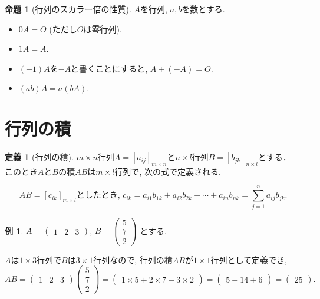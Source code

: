 \documentclass[dvipdfmx,a4paper,11pt]{article}
\theoremstyle{definition}
\newtheorem{prop}[thm]{命題}
\newtheorem{dfn}[thm]{定義}
\newtheorem{exa}[thm]{例}
\begin{document}
 
 \begin{tcolorbox}[
    colback = white,
    colframe = green!35!black,
    fonttitle = \bfseries,
    breakable = true]
    \begin{prop}[行列のスカラー倍の性質]
$A$を行列, $a,b$を数とする.
 \begin{itemize}
 \item $0A =O$ (ただし$O$は零行列).
  \item $1A=A$. 
  \item $(-1)A$を$-A$と書くことにすると, $A + (-A) =O$.　
  \item $(ab) A = a(bA)$.
 \end{itemize}
  \end{prop}
 \end{tcolorbox}
 
 \section{行列の積}
 
  \begin{tcolorbox}[
    colback = white,
    colframe = green!35!black,
    fonttitle = \bfseries,
    breakable = true]
    \begin{dfn}[行列の積]
    
 $m \times n$行列$A = [a_{ij}]_{m \times n}$と$n \times l$行列$B= [b_{jk}]_{n \times l}$とする．
このとき$A$と$B$の積$AB$は$m \times l$行列で, 次の式で定義される.

$$
AB = [c_{ik}]_{m \times l}\text{としたとき, }
c_{ik} = a_{i1}b_{1k} + a_{i2}b_{2k} + \cdots + a_{in}b_{nk} = \sum_{j=1}^{n} a_{ij}b_{jk}.
$$
  \end{dfn}
 \end{tcolorbox}
 
 \begin{exa}
 $ A=\begin{pmatrix} 1 &2 &3 \end{pmatrix}$, 
 $ 
 B = 
 \begin{pmatrix}
5 \\7\\2
 \end{pmatrix}
 $
 とする. 
 
 $A$は$1\times 3$行列で$B$は$3 \times 1$行列なので, 行列の積$AB$が$1 \times 1$行列として定義でき, 
 $$
 AB = \begin{pmatrix}1 &2&3  \end{pmatrix}
 \begin{pmatrix}
5 \\7\\2
 \end{pmatrix}
 = \begin{pmatrix}1\times 5 + 2 \times 7 + 3 \times 2  \end{pmatrix}= 
  \begin{pmatrix}5+14+6 \end{pmatrix}= \begin{pmatrix}25 \end{pmatrix}.
 $$
 
 \end{exa}
 
\end{document}
